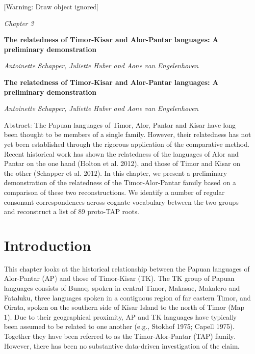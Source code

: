 
[Warning: Draw object ignored]\clearpage\setcounter{page}{1}\pagestyle{Standard}
{\centering
\textit{Chapter 3}
\par}

{\centering
\textbf{The relatedness of Timor-Kisar and Alor-Pantar languages: A preliminary demonstration}
\par}

{\centering
\textit{Antoinette Schapper, Juliette Huber and Aone van Engelenhoven}
\par}

\setcounter{tocdepth}{3}
\renewcommand\contentsname{}
\tableofcontents
{}

{\centering
\textbf{The relatedness of Timor-Kisar and Alor-Pantar languages: A preliminary demonstration}
\par}

{\centering
\textit{Antoinette Schapper, Juliette Huber and Aone van Engelenhoven}
\par}

Abstract: The Papuan languages of Timor, Alor, Pantar and Kisar have long been thought to be members of a single family. However, their relatedness has not yet been established through the rigorous application of the comparative method. Recent historical work has shown the relatedness of the languages of Alor and Pantar on the one hand (Holton et al. 2012), and those of Timor and Kisar on the other (Schapper et al. 2012). In this chapter, we present a preliminary demonstration of the relatedness of the Timor-Alor-Pantar family based on a comparison of these two reconstructions. We identify a number of regular consonant correspondences across cognate vocabulary between the two groups and reconstruct a list of 89 proto-TAP roots. 

\section[Introduction]{Introduction}
\hypertarget{RefHeading65403871885726}{}This chapter looks at the historical relationship between the Papuan languages of Alor-Pantar (AP) and those of Timor-Kisar (TK). The TK group of Papuan languages consists of Bunaq, spoken in central Timor, Makasae, Makalero and Fataluku, three languages spoken in a contiguous region of far eastern Timor, and Oirata, spoken on the southern side of Kisar Island to the north of Timor (Map 1). Due to their geographical proximity, AP and TK languages have typically been assumed to be related to one another (e.g., Stokhof 1975; Capell 1975). Together they have been referred to as the Timor-Alor-Pantar (TAP) family. However, there has been no substantive data-driven investigation of the claim.

